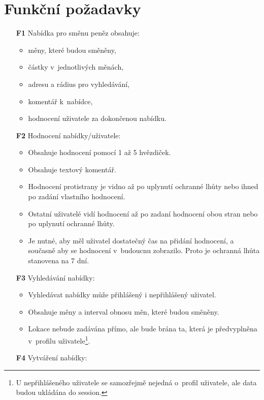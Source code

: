\section{Funkční požadavky}
\begin{itemize}
    \item[\textbf{F1}] Nabídka pro směnu peněz obsahuje:
        \begin{itemize}
            \item měny, které budou směněny,
            \item částky v~jednotlivých měnách,
            \item adresu a rádius pro vyhledávání,
            \item komentář k~nabídce,
            \item hodnocení uživatele za dokončenou nabídku.
        \end{itemize}
    \item[\textbf{F2}] Hodnocení nabídky/uživatele:
        \begin{itemize}
            \item Obsahuje hodnocení pomocí 1 až 5 hvězdiček.
            \item Obsahuje textový komentář.
            \item Hodnocení protistrany je vidno až po uplynutí ochranné lhůty nebo ihned po zadání vlastního hodnocení.
            \item Ostatní uživatelé vidí hodnocení až po zadaní hodnocení obou stran nebo po uplynutí ochranné lhůty.
            \item Je nutné, aby měl uživatel dostatečný čas na přidání hodnocení, a současně aby se hodnocení v~budoucnu zobrazilo. Proto je ochranná lhůta stanovena na 7 dní.
        \end{itemize}
    \item[\textbf{F3}] Vyhledávání nabídky:
        \begin{itemize}
            \item Vyhledávat nabídky může přihlášený i nepřihlášený uživatel.
            \item Obsahuje měny a interval obnosu měn, které budou směněny.
            \item Lokace nebude zadávána přímo, ale bude brána ta, která je předvyplněna v~profilu uživatele\footnote{U nepřihlášeného uživatele se samozřejmě nejedná o~profil uživatele, ale data budou ukládána do session.}.
        \end{itemize}
    \item[\textbf{F4}] Vytváření nabídky:

\end{itemize}

